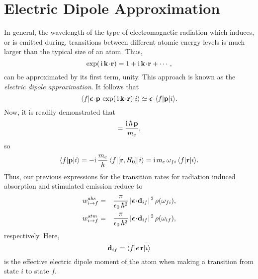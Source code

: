 \section{Electric Dipole Approximation}\label{s13.8}
In general, the wavelength of the type of electromagnetic
radiation which induces, or is emitted during, transitions between different
atomic energy levels is much larger than the typical size of an atom.
Thus,
\begin{equation}
\exp(\,{\rm i}\,{\bf k}\!\cdot\!{\bf r}) = 1 + {\rm i}\, {\bf k}\!\cdot\!{\bf r}+\cdots,
\end{equation}
can be approximated by its first term, unity. This approach is
known as the {\em electric dipole approximation}.
It follows that
\begin{equation}
\langle f|\mbox{\boldmath$\epsilon$}\!\cdot\!{\bf p}\,\exp(\,{\rm i}\,{\bf k}\!\cdot\!{\bf r})|i\rangle\simeq {\mbox{\boldmath$\epsilon$}}\!\cdot\!\langle f|{\bf p}|i\rangle.
\end{equation}
Now, it is readily demonstrated that
\begin{equation}
[{\bf r}, H_0] = \frac{{\rm i}\,\hbar\,{\bf p}}{m_e},
\end{equation}
so
\begin{equation}
\langle f|{\bf p}|i\rangle = - {\rm i}\,\frac{m_e}{\hbar}\,\langle f|[{\bf r},H_0]|i\rangle = {\rm i}\,m_e\,\omega_{fi}\,\langle f|{\bf r}|i\rangle.
\end{equation}
Thus,  our previous expressions for the transition rates for radiation induced absorption and
stimulated emission reduce to
\begin{eqnarray}\label{e13.97}
w_{i\rightarrow f}^{abs} &=& \frac{\pi}{\epsilon_0\,\hbar^2}\,|\mbox{\boldmath$\epsilon$}\!\cdot \!{\bf d}_{if}|^{\,2}\,\rho(\omega_{fi}),\\[0.5ex]
w_{i\rightarrow f}^{stm} &=& \frac{\pi}{\epsilon_0\,\hbar^2}\,|\mbox{\boldmath$\epsilon$}\!\cdot\!{\bf d}_{if}|^{\,2}\,\rho(\omega_{if}),\label{e13.98}
\end{eqnarray}
respectively. Here,
\begin{equation}
{\bf d}_{if} = \langle f|e\,{\bf r}|i\rangle
\end{equation}
is the effective electric dipole moment of the atom when making a
transition from state $i$ to state $f$.

